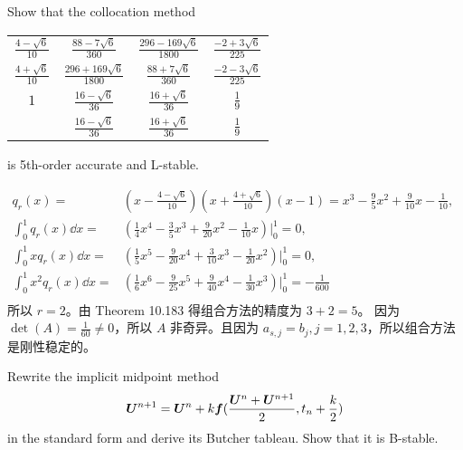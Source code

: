 \documentclass[lang=cn,a4paper,newtx,bibend=bibtex]{elegantpaper}
\begin{document}
\begin{prob}[Exercise 10.220]
  Show that the collocation method
  \begin{tabular}{c|ccc}
    $\frac{4-\sqrt 6}{10}$ & $\frac{88-7\sqrt 6}{360}$ & $\frac{296-169\sqrt 6}{1800}$ & $\frac{-2+3\sqrt 6}{225}$ \\
    $\frac{4+\sqrt 6}{10}$ & $\frac{296+169\sqrt 6}{1800}$ & $\frac{88+7\sqrt 6}{360}$ & $\frac{-2-3\sqrt 6}{225}$ \\
    $1$ & $\frac{16-\sqrt 6}{36}$ & $\frac{16+\sqrt 6}{36}$ & $\frac 19$ \\
    \hline
    & $\frac{16-\sqrt 6}{36}$ & $\frac{16+\sqrt 6}{36}$ & $\frac 19$ \\
  \end{tabular}
  is 5th-order accurate and L-stable.
\end{prob}

\begin{solution}
  \begin{equation*}
    \begin{aligned}
      q_r(x) = & (x-\frac{4-\sqrt 6}{10})(x+\frac {4+\sqrt 6}{10})(x-1) = x^3 - \frac 95 x^2 + \frac 9{10} x - \frac 1{10}, & \\
      \int_0^1 q_r(x)\dd x = & (\frac 14 x^4 - \frac 35 x^3 + \frac 9{20} x^2 - \frac 1{10} x)\bigg|_0^1 = 0, & \\
      \int_0^1 xq_r(x)\dd x = & (\frac 15 x^5 - \frac 9{20} x^4 + \frac 3{10} x^3 - \frac 1{20} x^2)\bigg|_0^1 = 0, & \\
      \int_0^1 x^2q_r(x)\dd x = & (\frac 16 x^6 - \frac 9{25} x^5 + \frac 9{40} x^4 - \frac 1{30} x^3)\bigg|_0^1 = -\frac 1{600} & \\
    \end{aligned}
  \end{equation*}
  所以 $r=2$。由 Theorem 10.183 得组合方法的精度为 $3+2=5$。
  因为 $\det(A) = \frac 1{60} \neq 0$，所以 $A$ 非奇异。且因为 $a_{s,j} = b_j, j=1,2,3$，所以组合方法是刚性稳定的。
\end{solution}

\begin{prob}[Exercise 10.229]
  Rewrite the implicit midpoint method
  \begin{equation*}
    \bm{U}^{n+1} = \bm{U}^n + k\bm{f}(\dfrac{\bm{U}^n + \bm{U}^{n+1}}2, t_n + \dfrac k2)
  \end{equation*}
  in the standard form and derive its Butcher tableau.
  Show that it is B-stable.
\end{prob}
\end{document}

